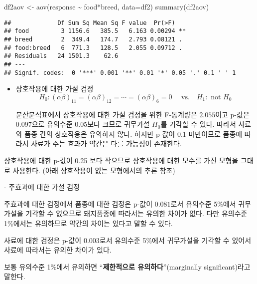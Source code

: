 \documentclass[
]{book}
\makeatletter
\newenvironment{Shaded}{\begin{snugshade}}{\end{snugshade}}
\newcommand{\AttributeTok}[1]{\textcolor[rgb]{0.77,0.63,0.00}{#1}}
\newcommand{\FunctionTok}[1]{\textcolor[rgb]{0.00,0.00,0.00}{#1}}
\newcommand{\NormalTok}[1]{#1}
\newcommand{\OtherTok}[1]{\textcolor[rgb]{0.56,0.35,0.01}{#1}}
\newcommand{\SpecialCharTok}[1]{\textcolor[rgb]{0.00,0.00,0.00}{#1}}
\newenvironment{kframe}{%
\medskip{}
\setlength{\fboxsep}{.8em}
 \def\at@end@of@kframe{}%
 \ifinner\ifhmode%
  \def\at@end@of@kframe{\end{minipage}}%
  \begin{minipage}{\columnwidth}%
 \fi\fi%
 \def\FrameCommand##1{\hskip\@totalleftmargin \hskip-\fboxsep
 \colorbox{shadecolor}{##1}\hskip-\fboxsep
     \hskip-\linewidth \hskip-\@totalleftmargin \hskip\columnwidth}%
 \MakeFramed {\advance\hsize-\width
   \@totalleftmargin\z@ \linewidth\hsize
   \@setminipage}}%
 {\par\unskip\endMakeFramed%
 \at@end@of@kframe}
\newenvironment{rmdblock}[1]
  {
  \begin{itemize}
  \renewcommand{\labelitemi}{
    \raisebox{-.7\height}[0pt][0pt]{
      {\setkeys{Gin}{width=3em,keepaspectratio}\texttt{[image: images/\#1]}}
    }
  }
  \setlength{\fboxsep}{1em}
  \begin{kframe}
  \item
  }
  {
  \end{kframe}
  \end{itemize}
  }
\newenvironment{rmdnote}
  {\begin{rmdblock}{note}}
  {\end{rmdblock}}
\makeatother
\begin{document}
\begin{Shaded}
\begin{Highlighting}[]
\NormalTok{df2aov }\OtherTok{\textless{}{-}} \FunctionTok{aov}\NormalTok{(response }\SpecialCharTok{\textasciitilde{}}\NormalTok{ food}\SpecialCharTok{*}\NormalTok{breed, }\AttributeTok{data=}\NormalTok{df2)}
\FunctionTok{summary}\NormalTok{(df2aov)}
\end{Highlighting}
\end{Shaded}

\begin{verbatim}
##             Df Sum Sq Mean Sq F value  Pr(>F)   
## food         3 1156.6   385.5   6.163 0.00294 **
## breed        2  349.4   174.7   2.793 0.08121 . 
## food:breed   6  771.3   128.5   2.055 0.09712 . 
## Residuals   24 1501.3    62.6                   
## ---
## Signif. codes:  0 '***' 0.001 '**' 0.01 '*' 0.05 '.' 0.1 ' ' 1
\end{verbatim}

\begin{itemize}
\item
  상호작용에 대한 가설 검정
  \[ H_0: (\alpha \beta)_{11} = (\alpha \beta)_{12} =\cdots = (\alpha \beta)_{6} =0 \quad \text{ vs.} \quad H_1: \text{ not } H_0 \]

  분산분석표에서 상호작용에 대한 가설 검정을 위한 F-통계량은 \(2.055\)이고 p-값은 0.097으로 유의수준 0.05보다 크므로 귀무가설 \(H_0\)를 기각할 수 있다. 따라서 사료와 품종 간의 상호작용은 유의하지 않다. 하지만 p-값이 0.1 미만이므로 품종에 따라서 사료가 주는 효과가 약간은 다를 가능성이 존재한다.
\end{itemize}

\begin{rmdnote}
상호작용에 대한 p-값이 0.25 보다 작으므로 상호작용에 대한 모수를 가진 모형을 그대로 사용한다. (아래 상호작용이 없는 모형에서의 추론 참조)
\end{rmdnote}
- 주효과에 대한 가설 검정

주효과에 대한 검정에서 품종에 대한 검정은 p-값이 \(0.081\)로서 유의수준 5\%에서 귀무가설을 기각할 수 없으므로 돼지품종에 따라서는 유의한 차이가 없다. 다만 유의수준 1\%에서는 유의하므로 약간의 차이는 있다고 말할 수 있다.

사료에 대한 검정은 p-값이 \(0.003\)로서 유의수준 5\%에서 귀무가설을 기각할 수 있어서 사료에 따라서는 유의한 차이가 있다.

\begin{rmdnote}
보통 유의수준 1\%에서 유의하면 ``\textbf{제한적으로 유의하다}''(marginally significant)라고 말한다.
\end{rmdnote}
\end{document}
